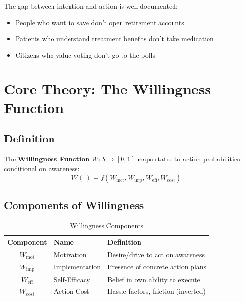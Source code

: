 The gap between intention and action is well-documented:
\begin{itemize}
\item People who want to save don't open retirement accounts
\item Patients who understand treatment benefits don't take medication
\item Citizens who value voting don't go to the polls
\end{itemize}

\section{Core Theory: The Willingness Function}
\label{sec:ready-theory}

\subsection{Definition}

\begin{definition}
The \textbf{Willingness Function} $W: \mathcal{S} \to [0, 1]$ maps states to
action probabilities conditional on awareness:
\begin{equation}
W(\cdot) = f(W_{\text{mot}}, W_{\text{imp}}, W_{\text{eff}}, W_{\text{cost}})
\end{equation}
\end{definition}

\subsection{Components of Willingness}

\begin{table}[htbp]
\centering
\caption{Willingness Components}
\label{tab:ready-components}
\renewcommand{\arraystretch}{1.3}
\begin{tabular}{@{}clp{5cm}@{}}
\toprule
\textbf{Component} & \textbf{Name} & \textbf{Definition} \\
\midrule
$W_{\text{mot}}$ & Motivation & Desire/drive to act on awareness \\
$W_{\text{imp}}$ & Implementation & Presence of concrete action plans \\
$W_{\text{eff}}$ & Self-Efficacy & Belief in own ability to execute \\
$W_{\text{cost}}$ & Action Cost & Hassle factors, friction (inverted) \\
\bottomrule
\end{tabular}
\end{table}

